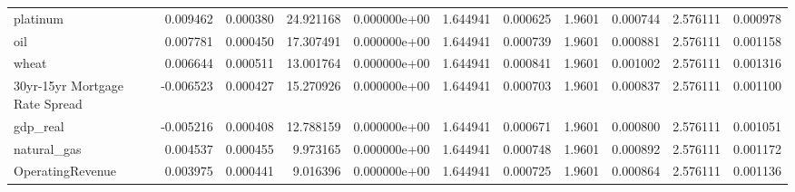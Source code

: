 \documentclass[12pt,a4paper,english]{article}
\begin{document}
{{\begin{tabular}{@{}lrrrrrrrrrr@{}}
			platinum                       & 0.009462                 & 0.000380                    & 24.921168                 & 0.000000e+00                             & 1.644941                      & 0.000625                      & 1.9601                       & 0.000744                     & 2.576111                     & 0.000978                     \\
			oil                            & 0.007781                 & 0.000450                    & 17.307491                 & 0.000000e+00                             & 1.644941                      & 0.000739                      & 1.9601                       & 0.000881                     & 2.576111                     & 0.001158                     \\
			wheat                          & 0.006644                 & 0.000511                    & 13.001764                 & 0.000000e+00                             & 1.644941                      & 0.000841                      & 1.9601                       & 0.001002                     & 2.576111                     & 0.001316                     \\
			30yr-15yr Mortgage Rate Spread & -0.006523                & 0.000427                    & 15.270926                 & 0.000000e+00                             & 1.644941                      & 0.000703                      & 1.9601                       & 0.000837                     & 2.576111                     & 0.001100                     \\
			gdp\_real                      & -0.005216                & 0.000408                    & 12.788159                 & 0.000000e+00                             & 1.644941                      & 0.000671                      & 1.9601                       & 0.000800                     & 2.576111                     & 0.001051                     \\
			natural\_gas                   & 0.004537                 & 0.000455                    & 9.973165                  & 0.000000e+00                             & 1.644941                      & 0.000748                      & 1.9601                       & 0.000892                     & 2.576111                     & 0.001172                     \\
			OperatingRevenue               & 0.003975                 & 0.000441                    & 9.016396                  & 0.000000e+00                             & 1.644941                      & 0.000725                      & 1.9601                       & 0.000864                     & 2.576111                     & 0.001136                     \\

\end{tabular}}}
\end{document}
